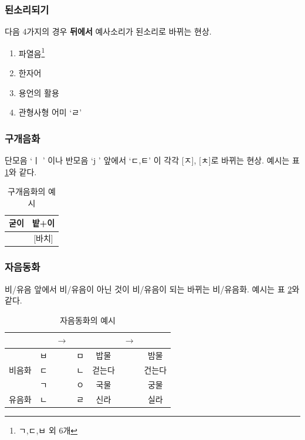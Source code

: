 \documentclass[10pt]{report}
\begin{document}
\subsubsection{된소리되기}
다음 4가지의 경우 \textbf{뒤에서} 예사소리가 된소리로 바뀌는 현상.
\begin{enumerate}
\item 파열음\footnote{ㄱ,ㄷ,ㅂ 외 6개}
\item 한자어
\item 용언의 활용
\item 관형사형 어미 `ㄹ'
\end{enumerate}

\subsubsection{구개음화}
단모음 `ㅣ ' 이나 반모음 `j ' 앞에서 `ㄷ,ㅌ' 이 각각 [ㅈ], [ㅊ]로 바뀌는 현상. 예시는 표 \ref{palatalization}와 같다.

\begin{table}
\begin{center}
	\begin{tabular}{|c|c|}
		\hline
		굳이 & 밭+이 \\
		\hline
		[구지] & [바치] \\
		\hline
	\end{tabular}
	\caption{구개음화의 예시}
	\label{palatalization}
\end{center}
\end{table}

\subsubsection{자음동화}
비/유음 앞에서 비/유음이 아닌 것이 비/유음이 되는 바뀌는 비/유음화. 예시는 표 \ref{consonant_story}와 같다.
\begin{table}
\begin{center}
	\begin{tabular}{|c|c|c|c|c|c|c|}
		\hline
		 & & $\rightarrow$ & & & $\rightarrow$ & \\
		\hline
		\multirow{3}{*}{비음화}
		& ㅂ & & ㅁ & 밥물 & & 밤물\\
		\cline{2-7}
		& ㄷ & & ㄴ & 걷는다 & & 건는다\\
		\cline{2-7}
		& ㄱ & & ㅇ & 국물 & & 궁물\\
		\hline
		유음화 & ㄴ & & ㄹ & 신라 & & 실라\\
		\hline
	\end{tabular}
	\caption{자음동화의 예시}
	\label{consonant_story}
\end{center}
\end{table}
\end{document}
